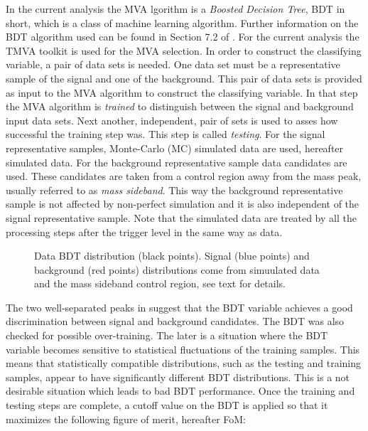 In the current analysis the MVA lgorithm is a {\it Boosted Decision Tree}, BDT in short, which is a class
of machine learning  algorithm. Further information on the BDT algorithm used can be found in Section 7.2 of \cite{TMVA}.
For the current analysis the TMVA toolkit \cite{TMVA} is used for the MVA selection. In order to construct the classifying variable,
a pair of data sets is needed. One data set must be a representative sample of the signal and one of the background.
This pair of data sets is provided as input to the MVA algorithm to construct the classifying variable.
In that step the MVA algorithm is {\it trained} to distinguish between the signal and background input data sets.
Next another, independent, pair of sets is used to asses how successful the training step was. This step is called {\it testing}.
For the signal representative samples, \BsJpsiKst Monte-Carlo (MC) simulated data are used, hereafter simulated data.
For the background representative sample data candidates are used. These candidates are taken from a control
region away from the \BsJpsiKst mass peak, usually referred to as {\it mass sideband}. This way the background representative sample
is not affected by non-perfect simulation and it is also independent of the signal representative sample.
Note that the simulated data are treated by all the processing steps after the \lzero trigger level in the same way as data.

\begin{figure}[!t]
\centering
  \scalebox{1}{}
  \caption{Data BDT distribution (black points). Signal (blue points) and background (red points) distributions
           come from simuulated data and the \Bs mass sideband control region, see text for details.}
  \label{BTDG_performance}
\end{figure}


The two well-separated peaks in  suggest that the BDT variable achieves a good
discrimination between signal and background candidates. The BDT was also checked for possible over-training.
The later is a situation where the BDT variable becomes sensitive to statistical fluctuations of the training samples.
This means that statistically compatible distributions, such as the testing and training samples,
appear to have significantly different BDT distributions. This is a not desirable situation which leads to
bad BDT performance. Once the training and testing steps are complete, a cutoff value on the BDT is applied
so that it maximizes the following figure of merit, hereafter FoM:

